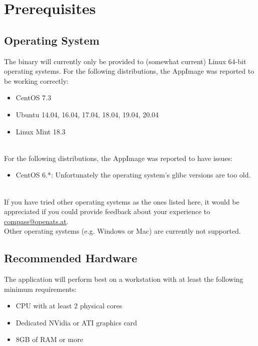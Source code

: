 \section{Prerequisites}

\subsection{Operating System}

The binary will currently only be provided to (somewhat current) Linux 64-bit operating systems. For the following distributions, the AppImage was reported to be working correctly:

\begin{itemize}  
\item CentOS 7.3
\item Ubuntu 14.04, 16.04, 17.04, 18.04, 19.04, 20.04
\item Linux Mint 18.3
\end{itemize}
\ \\

For the following distributions, the AppImage was reported to have issues:

\begin{itemize}  
\item CentOS 6.*: Unfortunately the operating system's glibc versions are too old.
\end{itemize}
\ \\

If you have tried other operating systems as the ones listed here, it would be appreciated if you could provide feedback about your experience to \href{mailto:compass@openats.at}{compass@openats.at}.\\

Other operating systems (e.g. Windows or Mac) are currently not supported.

\subsection{Recommended Hardware}

The application will perform best on a workstation with at least the following minimum requirements:

\begin{itemize}  
\item CPU with at least 2 physical cores
\item Dedicated NVidia or ATI graphics card
\item 8GB of RAM or more
\end{itemize}
\ \\

